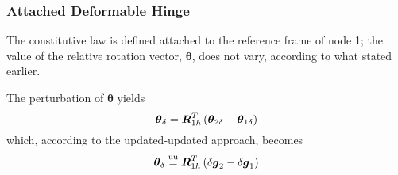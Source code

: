 \documentclass[10pt,dvips,fleqn]{report}
\newcommand{\T}[1]{\boldsymbol{#1}}
\newcommand{\equu}{\overset{\mathrm{uu}}{=}}
\begin{document}
\subsubsection{Attached Deformable Hinge}
The constitutive law is defined attached to the reference frame of node 1;
the value of the relative rotation vector, $\T{\theta}$, does not vary,
according to what stated earlier.

The perturbation of $\T{\theta}$ yields
\begin{equation}
	\T{\theta}_{\delta} = \T{R}_{1h}^T\plbr{\T{\theta}_{2\delta} - \T{\theta}_{1\delta}}
\end{equation}
which, according to the updated-updated approach, becomes
\begin{equation}
	\T{\theta}_{\delta} \equu \T{R}_{1h}^T\plbr{\delta\T{g}_2 - \delta\T{g}_1}
\end{equation}
\end{document}

